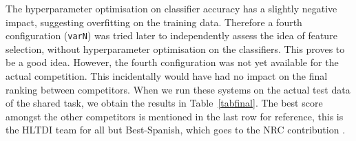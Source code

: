 \begin{table}
\footnotesize
\noindent{}
\caption{Results on the trial data}
\label{tabpar}
\end{table}

The hyperparameter optimisation on classifier accuracy has a slightly negative
impact, suggesting overfitting on the training data. Therefore a fourth
configuration (\texttt{varN}) was tried later to independently assess the idea
of feature selection, without hyperparameter optimisation on the classifiers.
This proves to be a good idea. However, the fourth configuration was not yet
available for the actual competition. This incidentally would have had no
impact on the final ranking between competitors. When we run these systems on
the actual test data of the shared task, we obtain the results in
Table~\ref{tabfinal}. The best score amongst the other competitors is mentioned
in the last row for reference, this is the HLTDI team \citep{HLTDI} for all but
Best-Spanish, which goes to the NRC contribution \citep{CARPUAT}.

